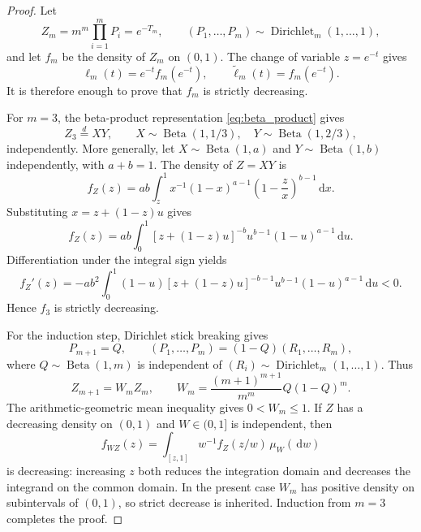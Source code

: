 \documentclass[11pt]{article}
\theoremstyle{remark}
\newcommand{\dd}{\,\mathrm d}
\newcommand{\Dir}{\operatorname{Dirichlet}}
\newcommand{\Bet}{\operatorname{Beta}}
\begin{document}
\begin{proof}
Let
\[
 Z_m=m^m\prod_{i=1}^mP_i=e^{-T_m},
 \qquad (P_1,\ldots,P_m)\sim\Dir_m(1,\ldots,1),
\]
and let $f_m$ be the density of $Z_m$ on $(0,1)$. The change of variable $z=e^{-t}$ gives
\begin{equation}
 \ell_m(t)=e^{-t}f_m(e^{-t}),
 \qquad
 \widetilde\ell_m(t)=f_m(e^{-t}).
 \label{eq:ell_f_relation}
\end{equation}
It is therefore enough to prove that $f_m$ is strictly decreasing.

For $m=3$, the beta-product representation \eqref{eq:beta_product} gives
\[
 Z_3\overset d=XY,
 \qquad
 X\sim\Bet(1,1/3),\quad Y\sim\Bet(1,2/3),
\]
independently. More generally, let $X\sim\Bet(1,a)$ and $Y\sim\Bet(1,b)$ independently, with $a+b=1$. The density of $Z=XY$ is
\begin{equation}
 f_Z(z)=ab\int_z^1 x^{-1}(1-x)^{a-1}
 \left(1-\frac{z}{x}\right)^{b-1}\dd x.
 \label{eq:product_beta_density}
\end{equation}
Substituting $x=z+(1-z)u$ gives
\begin{equation}
 f_Z(z)=ab\int_0^1
 [z+(1-z)u]^{-b}u^{b-1}(1-u)^{a-1}\dd u.
 \label{eq:product_beta_density2}
\end{equation}
Differentiation under the integral sign yields
\begin{equation}
 f_Z'(z)
 =-ab^2\int_0^1
 (1-u)[z+(1-z)u]^{-b-1}u^{b-1}(1-u)^{a-1}\dd u<0.
 \label{eq:product_beta_derivative}
\end{equation}
Hence $f_3$ is strictly decreasing.

For the induction step, Dirichlet stick breaking gives
\begin{equation}
 P_{m+1}=Q,
 \qquad
 (P_1,\ldots,P_m)=(1-Q)(R_1,\ldots,R_m),
 \label{eq:stick_break}
\end{equation}
where $Q\sim\Bet(1,m)$ is independent of $(R_i)\sim\Dir_m(1,\ldots,1)$. Thus
\begin{equation}
 Z_{m+1}=W_m Z_m,
 \qquad
 W_m=\frac{(m+1)^{m+1}}{m^m}Q(1-Q)^m.
 \label{eq:Z_induction}
\end{equation}
The arithmetic-geometric mean inequality gives $0<W_m\le1$. If $Z$ has a decreasing density on $(0,1)$ and $W\in(0,1]$ is independent, then
\begin{equation}
 f_{WZ}(z)=\int_{[z,1]}w^{-1}f_Z(z/w)\,\mu_W(\dd w)
 \label{eq:scaled_density}
\end{equation}
is decreasing: increasing $z$ both reduces the integration domain and decreases the integrand on the common domain. In the present case $W_m$ has positive density on subintervals of $(0,1)$, so strict decrease is inherited. Induction from $m=3$ completes the proof.
\end{proof}
\end{document}
